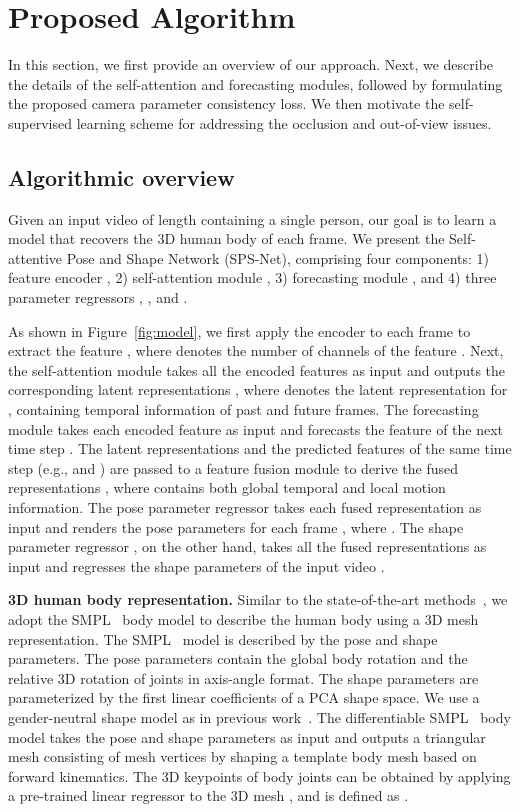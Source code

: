 \documentclass[times,referee,twocolumn,final,authoryear]{elsarticle}
\newcommand{\heading}[1]{\noindent\textbf{#1}}
\begin{document}
\vspace{-3.5mm}
\section{Proposed Algorithm}

In this section, we first provide an overview of our approach.
Next, we describe the details of the self-attention and forecasting modules, followed by formulating the proposed camera parameter consistency loss.
We then motivate the self-supervised learning scheme for addressing the occlusion and out-of-view issues.

\vspace{-1.5mm}
\subsection{Algorithmic overview}

Given an input video  of length  containing a single person, our goal is to learn a model that recovers the 3D human body of each frame.
We present the Self-attentive Pose and Shape Network (SPS-Net), comprising four components: 1) feature encoder , 2) self-attention module , 3) forecasting module , and 4) three parameter regressors , , and .

As shown in Figure~\ref{fig:model}, we first apply the encoder  to each frame  to extract the feature , where  denotes the number of channels of the feature .
Next, the self-attention module  takes all the encoded features  as input and outputs the corresponding latent representations , where  denotes the latent representation for , containing temporal information of past and future frames.
The forecasting module  takes each encoded feature  as input and forecasts the feature of the next time step .
The latent representations  and the predicted features  of the same time step (e.g.,  and ) are passed to a feature fusion module to derive the fused representations , where  contains both global temporal and local motion information. 
The pose parameter regressor  takes each fused representation  as input and renders the pose parameters  for each frame , where .
The shape parameter regressor , on the other hand, takes all the fused representations  as input and regresses the shape parameters  of the input video .

\heading{3D human body representation.}
Similar to the state-of-the-art methods~\citep{HMR,SPIN,VIBE}, we adopt the SMPL~\citep{SMPL} body model to describe the human body using a 3D mesh representation.
The SMPL~\citep{SMPL} model is described by the pose  and shape  parameters.
The pose parameters  contain the global body rotation and the relative 3D rotation of  joints in axis-angle format.
The shape parameters  are parameterized by the first  linear coefficients of a PCA shape space.
We use a gender-neutral shape model as in previous work~\citep{HMR,SPIN,VIBE}.
The differentiable SMPL~\citep{SMPL} body model takes the pose  and shape  parameters as input and outputs a triangular mesh  consisting of  mesh vertices by shaping a template body mesh based on forward kinematics.
The 3D keypoints  of  body joints can be obtained by applying a pre-trained linear regressor  to the 3D mesh , and is defined as .
\end{document}
